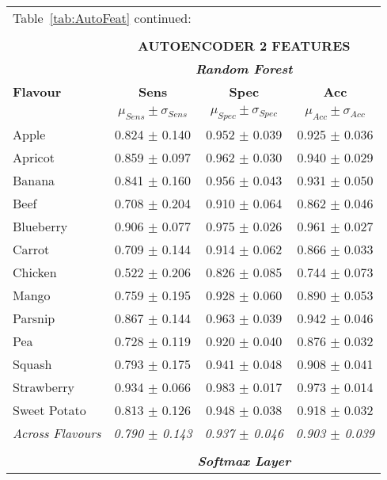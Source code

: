 \documentclass[authoryear]{elsarticle}
\begin{document}
	\begin{tabular}{lccc}
	\multicolumn{4}{l}{Table~\ref{tab:AutoFeat} continued:}\\
	\multicolumn{4}{c}{}\\
    \toprule
          & \multicolumn{3}{c}{\textbf{AUTOENCODER 2 FEATURES}} \\
          & \multicolumn{3}{c}{\textit{\textbf{Random Forest}}} \\
    \midrule
    \textbf{Flavour} & \textbf{Sens} & \textbf{Spec} & \textbf{Acc}\\
    & $\mu_{Sens} \pm \sigma_{Sens}$ & $\mu_{Spec} \pm \sigma_{Spec}$ & $\mu_{Acc} \pm \sigma_{Acc}$ \\
    \midrule
    Apple 		 & 0.824 $\pm$ 0.140 & 0.952 $\pm$ 0.039 & 0.925 $\pm$ 0.036 \\
    Apricot 	 & 0.859 $\pm$ 0.097 & 0.962 $\pm$ 0.030 & 0.940 $\pm$ 0.029 \\
    Banana 		 & 0.841 $\pm$ 0.160 & 0.956 $\pm$ 0.043 & 0.931 $\pm$ 0.050 \\
    Beef 		 & 0.708 $\pm$ 0.204 & 0.910 $\pm$ 0.064 & 0.862 $\pm$ 0.046 \\
    Blueberry 	 & 0.906 $\pm$ 0.077 & 0.975 $\pm$ 0.026 & 0.961 $\pm$ 0.027 \\
    Carrot 		 & 0.709 $\pm$ 0.144 & 0.914 $\pm$ 0.062 & 0.866 $\pm$ 0.033 \\
    Chicken 	 & 0.522 $\pm$ 0.206 & 0.826 $\pm$ 0.085 & 0.744 $\pm$ 0.073 \\
    Mango 		 & 0.759 $\pm$ 0.195 & 0.928 $\pm$ 0.060 & 0.890 $\pm$ 0.053 \\
    Parsnip 	 & 0.867 $\pm$ 0.144 & 0.963 $\pm$ 0.039 & 0.942 $\pm$ 0.046 \\
    Pea 		 & 0.728 $\pm$ 0.119 & 0.920 $\pm$ 0.040 & 0.876 $\pm$ 0.032 \\
    Squash 		 & 0.793 $\pm$ 0.175 & 0.941 $\pm$ 0.048 & 0.908 $\pm$ 0.041 \\
    Strawberry 	 & 0.934 $\pm$ 0.066 & 0.983 $\pm$ 0.017 & 0.973 $\pm$ 0.014 \\
    Sweet Potato & 0.813 $\pm$ 0.126 & 0.948 $\pm$ 0.038 & 0.918 $\pm$ 0.032 \\
    \midrule
    \textit{Across Flavours} & \textit{0.790 $\pm$ 0.143} & \textit{0.937 $\pm$ 0.046} & \textit{0.903 $\pm$ 0.039} \\
    \midrule
    \multicolumn{4}{c}{}\\
    \midrule
          & \multicolumn{3}{c}{\textit{\textbf{Softmax Layer}}} \\

\end{tabular}
\end{document}
